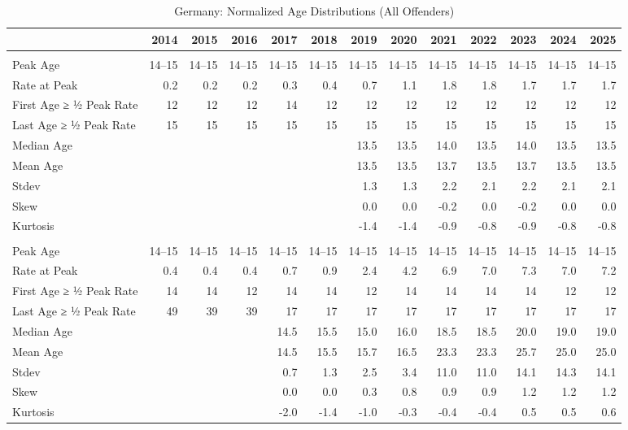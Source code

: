 \begin{table}[!t]
\caption*{
{\large Germany: Normalized Age Distributions (All Offenders)}
} 

\fontsize{12.0pt}{14.4pt}\selectfont

\begin{tabular*}{\linewidth}{@{\extracolsep{\fill}}l|rrrrrrrrrrrr}
\toprule
  & 2014 & 2015 & 2016 & 2017 & 2018 & 2019 & 2020 & 2021 & 2022 & 2023 & 2024 & 2025 \\ 
\midrule\addlinespace[2.5pt]
\multicolumn{13}{l}{Female} \\[2.5pt] 
\midrule\addlinespace[2.5pt]
Peak Age & 14–15 & 14–15 & 14–15 & 14–15 & 14–15 & 14–15 & 14–15 & 14–15 & 14–15 & 14–15 & 14–15 & 14–15 \\
Rate at Peak & 0.2 & 0.2 & 0.2 & 0.3 & 0.4 & 0.7 & 1.1 & 1.8 & 1.8 & 1.7 & 1.7 & 1.7 \\
First Age ≥ ½ Peak Rate & 12 & 12 & 12 & 14 & 12 & 12 & 12 & 12 & 12 & 12 & 12 & 12 \\
Last Age ≥ ½ Peak Rate & 15 & 15 & 15 & 15 & 15 & 15 & 15 & 15 & 15 & 15 & 15 & 15 \\
Median Age &  &  &  &  &  & 13.5 & 13.5 & 14.0 & 13.5 & 14.0 & 13.5 & 13.5 \\
Mean Age &  &  &  &  &  & 13.5 & 13.5 & 13.7 & 13.5 & 13.7 & 13.5 & 13.5 \\
Stdev &  &  &  &  &  & 1.3 & 1.3 & 2.2 & 2.1 & 2.2 & 2.1 & 2.1 \\
Skew &  &  &  &  &  & 0.0 & 0.0 & -0.2 & 0.0 & -0.2 & 0.0 & 0.0 \\
Kurtosis &  &  &  &  &  & -1.4 & -1.4 & -0.9 & -0.8 & -0.9 & -0.8 & -0.8 \\
\midrule\addlinespace[2.5pt]
\multicolumn{13}{l}{Male} \\[2.5pt] 
\midrule\addlinespace[2.5pt]
Peak Age & 14–15 & 14–15 & 14–15 & 14–15 & 14–15 & 14–15 & 14–15 & 14–15 & 14–15 & 14–15 & 14–15 & 14–15 \\
Rate at Peak & 0.4 & 0.4 & 0.4 & 0.7 & 0.9 & 2.4 & 4.2 & 6.9 & 7.0 & 7.3 & 7.0 & 7.2 \\
First Age ≥ ½ Peak Rate & 14 & 14 & 12 & 14 & 14 & 12 & 14 & 14 & 14 & 14 & 12 & 12 \\
Last Age ≥ ½ Peak Rate & 49 & 39 & 39 & 17 & 17 & 17 & 17 & 17 & 17 & 17 & 17 & 17 \\
Median Age &  &  &  & 14.5 & 15.5 & 15.0 & 16.0 & 18.5 & 18.5 & 20.0 & 19.0 & 19.0 \\
Mean Age &  &  &  & 14.5 & 15.5 & 15.7 & 16.5 & 23.3 & 23.3 & 25.7 & 25.0 & 25.0 \\
Stdev &  &  &  & 0.7 & 1.3 & 2.5 & 3.4 & 11.0 & 11.0 & 14.1 & 14.3 & 14.1 \\
Skew &  &  &  & 0.0 & 0.0 & 0.3 & 0.8 & 0.9 & 0.9 & 1.2 & 1.2 & 1.2 \\
Kurtosis &  &  &  & -2.0 & -1.4 & -1.0 & -0.3 & -0.4 & -0.4 & 0.5 & 0.5 & 0.6 \\
\bottomrule
\end{tabular*}

\end{table}

